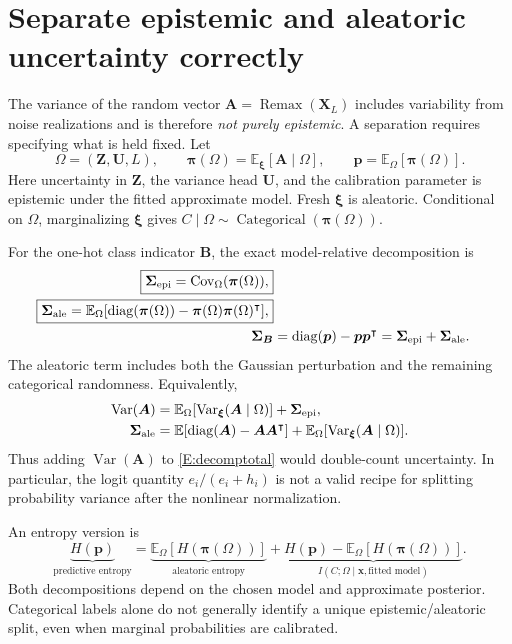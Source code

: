 \documentclass[letterpaper]{article}
\newcommand{\E}{\mathbb E}
\newcommand{\Var}{\operatorname{Var}}
\newcommand{\Cov}{\operatorname{Cov}}
\newcommand{\diag}{\operatorname{diag}}
\newcommand{\Remax}{\operatorname{Remax}}
\newcommand{\given}{\mid}
\begin{document}
\section{Separate epistemic and aleatoric uncertainty correctly}\label{S:decomposition}
The variance of the random vector $\bm A=\Remax(\bm X_L)$ includes variability from noise realizations and is therefore \emph{not purely epistemic}. A separation requires specifying what is held fixed. Let
\begin{equation}
\Omega=(\bm Z,\bm U,L),\qquad
\bm\pi(\Omega)=\E_{\bm\xi}[\bm A\given\Omega],\qquad
\bm p=\E_\Omega[\bm\pi(\Omega)].
\end{equation}
Here uncertainty in $\bm Z$, the variance head $\bm U$, and the calibration parameter is epistemic under the fitted approximate model. Fresh $\bm\xi$ is aleatoric. Conditional on $\Omega$, marginalizing $\bm\xi$ gives $C\given\Omega\sim\operatorname{Categorical}(\bm\pi(\Omega))$.

For the one-hot class indicator $\bm B$, the exact model-relative decomposition is
\begin{align}
\boxed{\bm\Sigma_{\rm epi}=\Cov_\Omega(\bm\pi(\Omega)),}\label{E:epi}\\
\boxed{\bm\Sigma_{\rm ale}=\E_\Omega[\diag(\bm\pi(\Omega))-\bm\pi(\Omega)\bm\pi(\Omega)^\intercal],}\label{E:ale}\\
\bm\Sigma_{\bm B}&=\diag(\bm p)-\bm p\bm p^\intercal
=\bm\Sigma_{\rm epi}+\bm\Sigma_{\rm ale}.\label{E:decomptotal}
\end{align}
The aleatoric term includes both the Gaussian perturbation and the remaining categorical randomness. Equivalently,
\begin{align}
\Var(\bm A)&=\E_\Omega[\Var_{\bm\xi}(\bm A\given\Omega)]+\bm\Sigma_{\rm epi},\\
\bm\Sigma_{\rm ale}&=\E[\diag(\bm A)-\bm A\bm A^\intercal]
+\E_\Omega[\Var_{\bm\xi}(\bm A\given\Omega)].
\label{E:nodoublecount}
\end{align}
Thus adding $\Var(\bm A)$ to \eqref{E:decomptotal} would double-count uncertainty. In particular, the logit quantity $e_i/(e_i+h_i)$ is not a valid recipe for splitting probability variance after the nonlinear normalization.

An entropy version is
\begin{equation}
\underbrace{H(\bm p)}_{\text{predictive entropy}}=
\underbrace{\E_\Omega[H(\bm\pi(\Omega))]}_{\text{aleatoric entropy}}+
\underbrace{H(\bm p)-\E_\Omega[H(\bm\pi(\Omega))]}_{I(C;\Omega\given\bm x,\text{fitted model})}.
\end{equation}
Both decompositions depend on the chosen model and approximate posterior. Categorical labels alone do not generally identify a unique epistemic/aleatoric split, even when marginal probabilities are calibrated.
\end{document}

